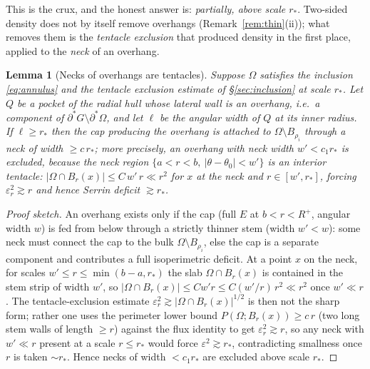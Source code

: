 \documentclass[11pt]{article}
\newtheorem{lemma}[theorem]{Lemma}
\theoremstyle{definition}
\newcommand{\Om}{\Omega}
\newcommand{\eps}{\varepsilon}
\begin{document}
This is the crux, and the honest answer is: \emph{partially, above scale
$r_*$}. Two-sided density does not by itself remove overhangs
(Remark~\ref{rem:thin}(ii)); what removes them is the \emph{tentacle
exclusion} that produced density in the first place, applied to the
\emph{neck} of an overhang.

\begin{lemma}[Necks of overhangs are tentacles]\label{lem:neck}
Suppose $\Om$ satisfies the inclusion \eqref{eq:annulus} and the tentacle
exclusion estimate of \S\ref{sec:inclusion} at scale $r_*$. Let $Q$ be a
pocket of the radial hull whose lateral wall is an overhang, i.e.\ a
component of $\partial^*G\setminus\partial^*\Om$, and let $\ell$ be the
angular width of $Q$ at its inner radius. If $\ell\ge r_*$ then the cap
producing the overhang is attached to $\Om\setminus B_{\rho_i}$ through a
neck of width $\ge c\,r_*$; more precisely, an overhang with neck width
$w'<c_1 r_*$ is excluded, because the neck region
$\{a<r<b,\ |\theta-\theta_0|<w'\}$ is an interior tentacle:
$|\Om\cap B_{r}(x)|\le C\,w'\,r\ll r^2$ for $x$ at the neck and
$r\in[w',r_*]$, forcing $\eps_r^2\gtrsim r$ and hence Serrin deficit
$\gtrsim r_*$.
\end{lemma}

\begin{proof}[Proof sketch]
An overhang exists only if the cap (full $E$ at $b<r<R^+$, angular width
$w$) is fed from below through a strictly thinner stem (width $w'<w$): some
neck must connect the cap to the bulk $\Om\setminus B_{\rho_i}$, else the
cap is a separate component and contributes a full isoperimetric deficit.
At a point $x$ on the neck, for scales $w'\le r\le \min(b-a,r_*)$ the slab
$\Om\cap B_r(x)$ is contained in the stem strip of width $w'$, so
$|\Om\cap B_r(x)|\le C w' r\le C(w'/r)\,r^2\ll r^2$ once $w'\ll r$. The
tentacle-exclusion estimate $\eps_r^2\gtrsim|\Om\cap B_r(x)|^{1/2}$ is then
not the sharp form; rather one uses the perimeter lower bound
$P(\Om;B_r(x))\ge c\,r$ (two long stem walls of length $\ge r$) against the
flux identity to get $\eps_r^2\gtrsim r$, so any neck with $w'\ll r$
present at a scale $r\le r_*$ would force $\eps^2\gtrsim r_*$, contradicting
smallness once $r$ is taken $\sim r_*$. Hence necks of width $<c_1r_*$ are
excluded above scale $r_*$.
\end{proof}
\end{document}
